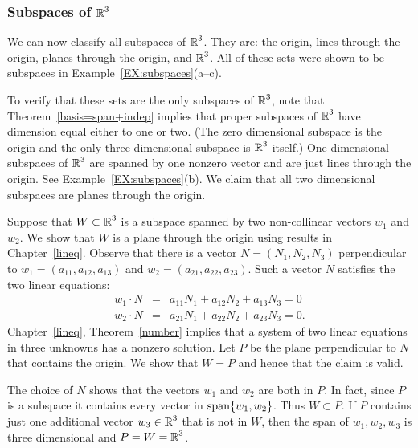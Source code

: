 \documentclass{ximera}
\begin{document}
\subsubsection*{Subspaces of $\mbox{$\Bbb{R}$}^3$}

We can now classify all subspaces of $\mbox{$\Bbb{R}$}^3$.  They are:  the origin, lines
through the origin, planes through the origin, and $\mbox{$\Bbb{R}$}^3$.  All of these
sets were shown to be subspaces in Example~\ref{EX:subspaces}(a--c).

To verify that these sets are the only subspaces of $\mbox{$\Bbb{R}$}^3$, note that
Theorem~\ref{basis=span+indep} implies that proper subspaces of $\mbox{$\Bbb{R}$}^3$ have
dimension equal either to one or two. (The zero dimensional subspace is the
origin and the only three dimensional subspace is $\mbox{$\Bbb{R}$}^3$ itself.)  One
dimensional subspaces of $\mbox{$\Bbb{R}$}^3$ are spanned by one nonzero vector and are just
lines through the origin.  See Example~\ref{EX:subspaces}(b).  We claim that
all two dimensional subspaces are planes through the origin.

Suppose that $W\subset\mbox{$\Bbb{R}$}^3$ is a subspace spanned by two non-collinear vectors
$w_1$ and $w_2$.  We show that $W$ is a plane 
through the origin using results in Chapter~\ref{lineq}.  Observe that there
is a vector $N=(N_1,N_2,N_3)$ perpendicular to $w_1=(a_{11},a_{12},a_{13})$
and $w_2=(a_{21},a_{22},a_{23})$.  Such a vector $N$ satisfies the two linear
equations:
\begin{eqnarray*}
w_1\cdot N & = & a_{11}N_1 + a_{12}N_2 + a_{13}N_3 = 0 \\
w_2\cdot N & = & a_{21}N_1 + a_{22}N_2 + a_{23}N_3 = 0.
\end{eqnarray*}
Chapter~\ref{lineq}, Theorem~\ref{number} implies that a system of two linear
equations in three unknowns has a nonzero solution.  Let $P$ be the plane
perpendicular  to $N$ that contains the origin.  We show
that $W=P$ and hence that the claim is valid.

The choice of $N$ shows that the vectors $w_1$ and $w_2$ are both in $P$. In
fact, since $P$ is a subspace it contains every vector in ${\rm span}\{w_1,w_2\}$.
Thus $W\subset P$.  If $P$ contains just one additional vector $w_3\in\mbox{$\Bbb{R}$}^3$
that is not in $W$, then the span of $w_1,w_2,w_3$ is three dimensional and
$P=W=\mbox{$\Bbb{R}$}^3$.



\EXER

\TEXER
\end{document}
